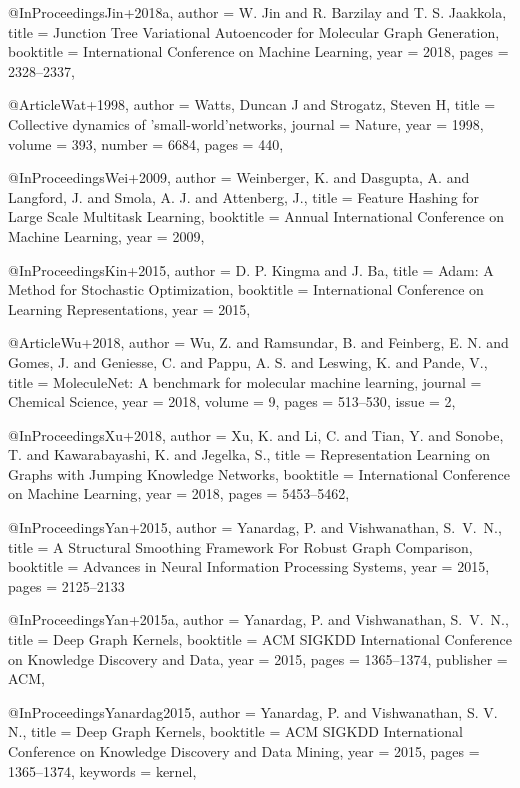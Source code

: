 @InProceedings{Jin+2018a,
  author    = {W. Jin and R. Barzilay and T. S. Jaakkola},
  title     = {Junction Tree Variational Autoencoder for Molecular Graph Generation},
  booktitle = {International Conference on Machine Learning},
  year      = {2018},
  pages     = {2328--2337},
}

@Article{Wat+1998,
  author  = {Watts, Duncan J and Strogatz, Steven H},
  title   = {Collective dynamics of ’small-world’networks},
  journal = {Nature},
  year    = {1998},
  volume  = {393},
  number  = {6684},
  pages   = {440},
}

@InProceedings{Wei+2009,
  author    = {Weinberger, K. and Dasgupta, A. and Langford, J. and Smola, A. J. and Attenberg, J.},
  title     = {Feature Hashing for Large Scale Multitask Learning},
  booktitle = {Annual International Conference on Machine Learning},
  year      = {2009},
}

@InProceedings{Kin+2015,
  author    = {D. P. Kingma and J. Ba},
  title     = {Adam: {A} Method for Stochastic Optimization},
  booktitle = {International Conference on Learning Representations},
  year      = {2015},
}

@Article{Wu+2018,
  author  = {Wu, Z. and Ramsundar, B. and Feinberg, E. N. and Gomes, J. and Geniesse, C. and Pappu, A. S. and Leswing, K. and Pande, V.},
  title   = {{MoleculeNet:} {A} benchmark for molecular machine learning},
  journal = {Chemical Science},
  year    = {2018},
  volume  = {9},
  pages   = {513--530},
  issue   = {2},
}

@InProceedings{Xu+2018,
  author    = {Xu, K. and Li, C. and Tian, Y. and Sonobe, T. and Kawarabayashi, K. and Jegelka, S.},
  title     = {Representation Learning on Graphs with Jumping Knowledge Networks},
  booktitle = {International Conference on Machine Learning},
  year      = {2018},
  pages     = {5453--5462},
}

@InProceedings{Yan+2015,
  author    = {Yanardag, P. and Vishwanathan, S.~V.~N.},
  title     = {A Structural Smoothing Framework For Robust Graph Comparison},
  booktitle = {Advances in Neural Information Processing Systems},
  year      = {2015},
  pages     = {2125--2133}
}

@InProceedings{Yan+2015a,
  author    = {Yanardag, P. and Vishwanathan, S.~V.~N.},
  title     = {Deep Graph Kernels},
  booktitle = {ACM SIGKDD International Conference on Knowledge Discovery and Data},
  year      = {2015},
  pages     = {1365--1374},
  publisher = {ACM},
}

@InProceedings{Yanardag2015,
  author    = {Yanardag, P. and Vishwanathan, S. V. N.},
  title     = {Deep Graph Kernels},
  booktitle = {ACM SIGKDD International Conference on Knowledge Discovery and Data Mining},
  year      = {2015},
  pages     = {1365--1374},
  keywords  = {kernel},
}

